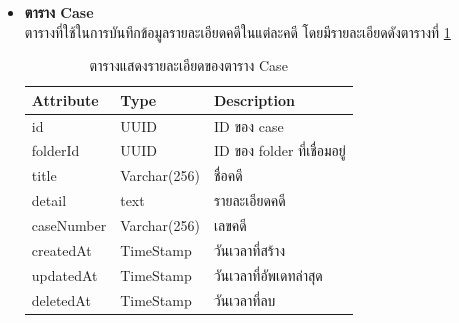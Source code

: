 \documentclass[12pt,oneside,openright,a4paper]{cpe-thai-project}
\begin{document}
\begin{itemize}
\item \textbf{ตาราง Case}\\
ตารางที่ใช้ในการบันทึกข้อมูลรายละเอียดคดีในแต่ละคดี โดยมีรายละเอียดดังตารางที่ \ref{tbl:dbCase}
\begin{table}[!ht]
    \centering
    \begin{tabular}{|p{4cm}|p{2cm}|p{6cm}|}
    \hline
    \textbf{Attribute} & \textbf{Type} & \textbf{Description}   \\ \hline
    id         & UUID        & ID ของ case                 \\ \hline
    folderId   & UUID        & ID ของ folder ที่เชื่อมอยู่ \\ \hline
    title      & Varchar(256) & ชื่อคดี                     \\ \hline
    detail     & text        & รายละเอียดคดี               \\ \hline
    caseNumber & Varchar(256) & เลขคดี                      \\ \hline
    createdAt  & TimeStamp   & วันเวลาที่สร้าง             \\ \hline
    updatedAt  & TimeStamp   & วันเวลาที่อัพเดทล่าสุด      \\ \hline
    deletedAt  & TimeStamp   & วันเวลาที่ลบ     \\ \hline
    \end{tabular}
    \caption{\centering  ตารางแสดงรายละเอียดของตาราง Case} \label{tbl:dbCase}
\end{table}


\end{itemize}
\end{document}
